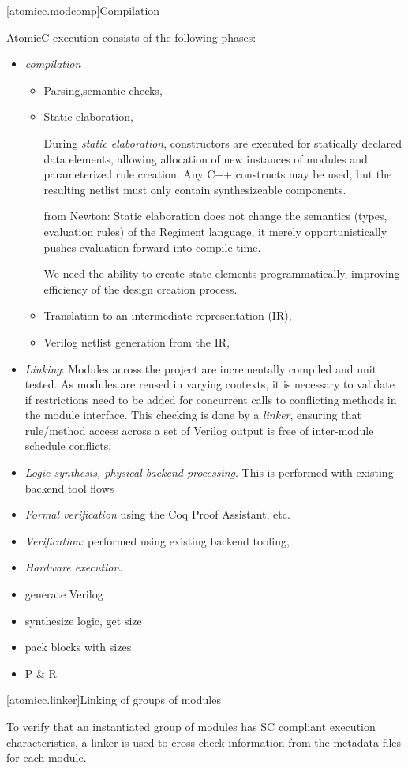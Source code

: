 [atomicc.modcomp]{Compilation}

AtomicC execution consists of the following phases:
\begin{itemize}
\item \textit{compilation}
\begin{itemize}
\item {Parsing,semantic checks},
\item {Static elaboration},

During \textit{static elaboration},
constructors are executed for statically declared data elements,
allowing allocation of new instances of modules and parameterized rule creation.
Any C++ constructs may be used, but
the resulting netlist must only contain synthesizeable components.

from Newton: 
Static elaboration does not change the semantics (types, evaluation rules) of the
Regiment language, it merely opportunistically pushes evaluation forward into compile time.

We need the ability to create state elements programmatically, improving
efficiency of the design creation process.
\item {Translation to an intermediate representation (IR)},
\item {Verilog netlist generation from the IR},
\end{itemize}
\item \textit{Linking}: Modules across the project are incrementally compiled
and unit tested.  As modules are reused in varying contexts, it is necessary
to validate if restrictions need to be added for concurrent calls to conflicting
methods in the module interface.
This checking is done by a \textit{linker},  ensuring that rule/method access
across a set of Verilog output is free of inter-module schedule conflicts,
\item \textit{Logic synthesis, physical backend processing}.  This is performed
with existing backend tool flows
\item \textit{Formal verification} using the Coq Proof Assistant, etc.
\item \textit{Verification}: performed using existing backend tooling,
\item \textit{Hardware execution}.
\end{itemize}

\begin{itemize}
\item generate Verilog
\item synthesize logic, get size
\item pack blocks with sizes
\item P \& R
\end{itemize}

[atomicc.linker]{Linking of groups of modules}

To verify that an instantiated group of modules has SC compliant execution characteristics, a linker is used to cross check information from the metadata files for each module.
